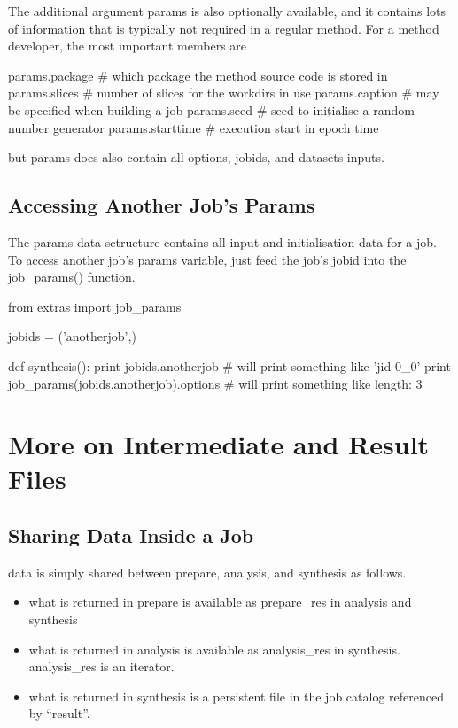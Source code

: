 The additional argument params is also optionally available, and it
contains lots of information that is typically not required in a
regular method.  For a method developer, the most important members
are

\begin{python}
params.package     # which package the method source code is stored in
params.slices      # number of slices for the workdirs in use
params.caption     # may be specified when building a job
params.seed        # seed to initialise a random number generator
params.starttime   # execution start in epoch time
\end{python}
but params does also contain all options, jobids, and datasets inputs.



\subsection{Accessing Another Job's Params}

The params data sctructure contains all input and initialisation data
for a job.  To access another job's params variable, just feed the
job's jobid into the job\_params() function.

\begin{python}
from extras import job_params

jobids = ('anotherjob',)

def synthesis():
  print jobids.anotherjob
  # will print something like 'jid-0_0'
  print job_params(jobids.anotherjob).options
  # will print something like {length: 3}
\end{python}




\newpage
\section{More on Intermediate and Result Files}

\subsection{Sharing Data Inside a Job}
data is simply shared between prepare, analysis, and synthesis as follows.
\begin{itemize}
\item what is returned in prepare is available as prepare\_res in analysis and synthesis
\item what is returned in analysis is available as analysis\_res in synthesis.  analysis\_res is an iterator.
\item what is returned in synthesis is a persistent file in the job catalog referenced by ``result''.
\end{itemize}

